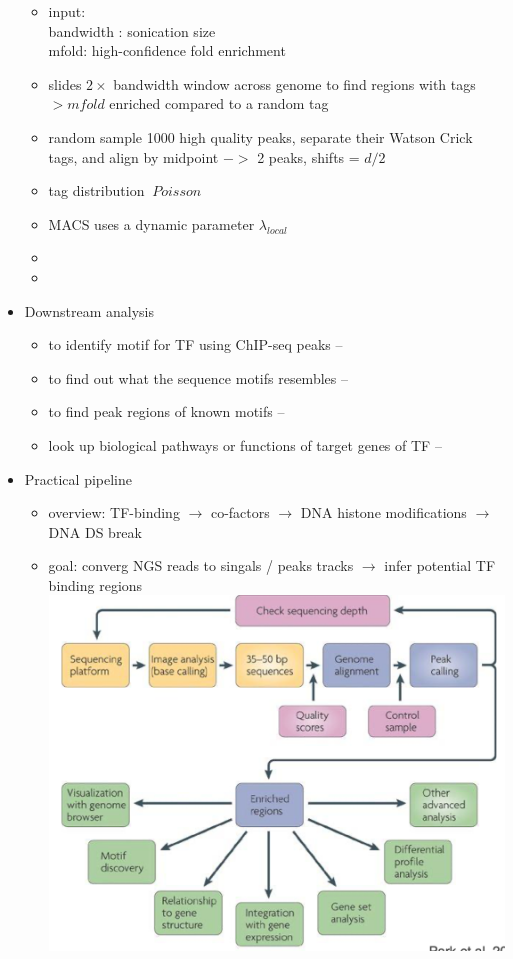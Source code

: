\documentclass[font=12pt]{article}
\begin{document}
\begin{itemize}
\begin{enumerate}
	\end{enumerate}
	\begin{itemize}
		\item input: \\
		bandwidth : sonication size\\
		mfold: high-confidence fold enrichment
		\item slides $ 2\times $ bandwidth window across genome to find regions with tags $ > mfold$ enriched compared to a random tag
		\item random sample 1000 high quality peaks, separate their Watson Crick tags, and align by midpoint $->$ 2 peaks, shifts = $ d/2 $
		\item tag distribution $ ~ Poisson $
		\item MACS uses a dynamic parameter $ \lambda_{local} $
		\item {}
		\item {}
	\end{itemize}
	\item Downstream analysis
	\begin{itemize}
		\item to identify motif for TF using ChIP-seq peaks -- 
		\item to find out what the sequence motifs resembles -- 
		\item to find peak regions of known motifs -- 
		\item look up biological pathways or functions of target genes of TF --
	\end{itemize}
	\item Practical pipeline
	\begin{itemize}
		\item overview: TF-binding $\to$ co-factors $\to$ DNA histone modifications $\to$ DNA DS break
		\item goal: converg NGS reads to singals / peaks tracks $\to$ infer potential TF binding regions\\
		\includegraphics[width=0.7\linewidth]{chipseqpipeline}

\end{itemize}
\end{itemize}
\end{document}
